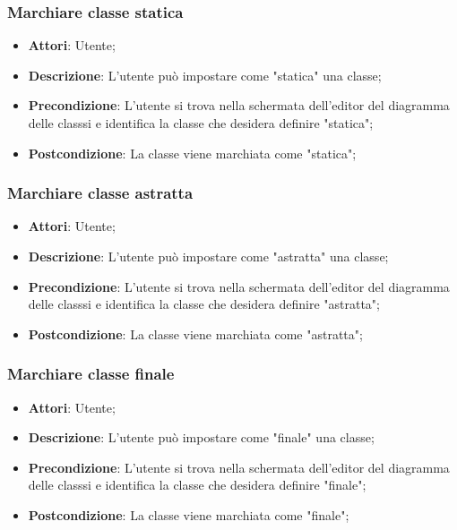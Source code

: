 \documentclass[../AnalisiDeiRequisiti.tex]{subfiles}
\begin{document}
	\subsubsection{Marchiare classe statica}
	\begin{itemize}
		\item \textbf{Attori}: Utente;
		\item \textbf{Descrizione}: L'utente può impostare come "statica" una classe;
		\item \textbf{Precondizione}: L’utente si trova nella schermata dell’editor del diagramma delle classsi e identifica la classe che desidera definire "statica";
		\item \textbf{Postcondizione}: La classe viene marchiata come "statica";
	\end{itemize}
	
	\subsubsection{Marchiare classe astratta}
	\begin{itemize}
		\item \textbf{Attori}: Utente;
		\item \textbf{Descrizione}: L'utente può impostare come "astratta" una classe;
		\item \textbf{Precondizione}: L’utente si trova nella schermata dell’editor del diagramma delle classsi e identifica la classe che desidera definire "astratta";
		\item \textbf{Postcondizione}: La classe viene marchiata come "astratta";
	\end{itemize}
	
	\subsubsection{Marchiare classe finale}
	\begin{itemize}
		\item \textbf{Attori}: Utente;
		\item \textbf{Descrizione}: L'utente può impostare come "finale" una classe;
		\item \textbf{Precondizione}: L’utente si trova nella schermata dell’editor del diagramma delle classsi e identifica la classe che desidera definire "finale";
		\item \textbf{Postcondizione}: La classe viene marchiata come "finale";
	\end{itemize}
	
\end{document}
